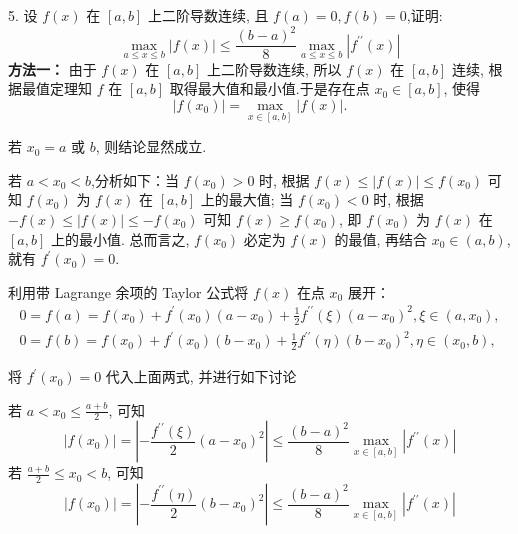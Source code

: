 \begin{tcolorbox}[breakable,enhanced,arc=0mm,outer arc=0mm,
		boxrule=0pt,toprule=1pt,leftrule=0pt,bottomrule=1pt, rightrule=0pt,left=0.2cm,right=0.2cm,
		titlerule=0.5em,toptitle=0.1cm,bottomtitle=-0.1cm,top=0.2cm,
		colframe=white!10!biru,colback=white!90!biru,coltitle=white,
            coltext=black,title =2024-03-10, title style={white!10!biru}, before skip=8pt, after skip=8pt,before upper=\hspace{2em},
		fonttitle=\bfseries,fontupper=\normalsize]
  
5. 设 $ {f}({x}) $ 在 $ [{a}, {b}] $ 上二阶导数连续, 且 $ {f}({a})=0, {f}({b})=0 $,证明:
$$
\max _{a \leq x \leq b}|f(x)| \leq \frac{(b-a)^{2}}{8} \max _{a \leq x \leq b}\left|f^{\prime \prime}(x)\right|
$$
 \tcblower
\textbf{方法一：}
由于 $ f(x) $ 在 $ [a, b] $ 上二阶导数连续, 所以 $ f(x) $ 在 $ [a, b] $ 连续, 根据最值定理知 $f$ 在 $ [a, b] $ 取得最大值和最小值.于是存在点 $ x_0 \in[a, b] $, 使得
$$
|f(x_0)|=\max _{x \in[a, b]}|f(x)| .
$$

  若 $ x_{0}=a $ 或 $ b $, 则结论显然成立. 
 
 若 $ a<x_{0}<b $,分析如下：当 $ f(x_0)>0 $ 时, 根据 $ f(x) \leq|f(x)| \leq f(x_0) $ 可知 $ f(x_0) $ 为 $ f(x) $ 在 $ [a, b] $ 上的最大值; 当 $ f(x_0)<0 $ 时, 根据 $ -f(x) \leq|f(x)| \leq-f(x_0) $ 可知 $ f(x) \geq f(x_0) $, 即 $ f(x_0) $ 为 $ f(x) $ 在 $ [a, b] $ 上的最小值. 总而言之, $ f(x_0) $ 必定为 $ f(x) $ 的最值, 再结合 $ x_0 \in(a, b) $, 就有 $ f^{\prime}(x_0)=0 $.
 
 利用带 Lagrange 余项的 Taylor 公式将 $ f(x) $ 在点 $ x_{0} $ 展开：
$$
\begin{array}{l}
0=f(a)=f\left(x_{0}\right)+f^{\prime}\left(x_{0}\right)\left(a-x_{0}\right)+\frac{1}{2} f^{\prime \prime}(\xi)\left(a-x_{0}\right)^{2}, \xi \in\left(a, x_{0}\right), \\
0=f(b)=f\left(x_{0}\right)+f^{\prime}\left(x_{0}\right)\left(b-x_{0}\right)+\frac{1}{2} f^{\prime \prime}(\eta)\left(b-x_{0}\right)^{2}, \eta \in\left(x_{0}, b\right),
\end{array}
$$

将 $f^{\prime}\left(x_{0}\right)=0 $ 代入上面两式, 并进行如下讨论

若 $ a<x_0 \leq \frac{a+b}{2} $, 可知 $$ |f(x_0)|=\left|-\frac{f^{\prime \prime}(\xi)}{2}(a-x_0)^{2}\right| \leq \frac{(b-a)^{2}}{8} \max _{x \in[a, b]}\left|f^{\prime \prime}(x)\right| $$
若 $ \frac{a+b}{2} \leq x_0<b $, 可知 $$ |f(x_0)|=\left|-\frac{f^{\prime \prime}(\eta)}{2}(b-x_0)^{2}\right| \leq \frac{(b-a)^{2}}{8} \max _{x \in[a, b]}\left|f^{\prime \prime}(x)\right| $$


\end{tcolorbox}
